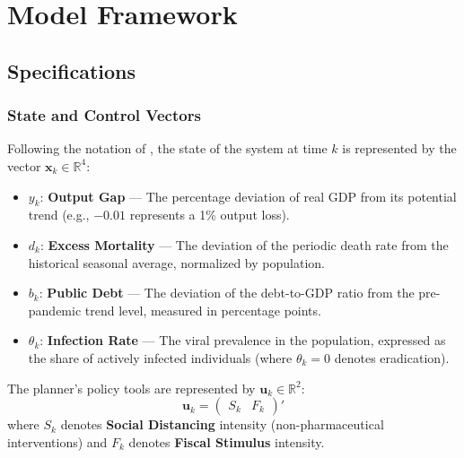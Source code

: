 


\section{Model Framework}

\subsection{Specifications}
\subsubsection{State and Control Vectors}

Following the notation of \citet{bertsekas2017dynamic}, the state of the system at time $k$  is represented by the vector $\bm{x}_k \in \mathbb{R}^4$:


\begin{itemize}
    \item $y_k$: \textbf{Output Gap} — The percentage deviation of real GDP from its potential trend (e.g., $-0.01$ represents a 1\% output loss).
    \item $d_k$: \textbf{Excess Mortality} — The deviation of the periodic death rate from the historical seasonal average, normalized by population.
    \item $b_k$: \textbf{Public Debt} — The deviation of the debt-to-GDP ratio from the pre-pandemic trend level, measured in percentage points.
    \item $\theta_k$: \textbf{Infection Rate} — The viral prevalence in the population, expressed as the share of actively infected individuals (where $\theta_k=0$ denotes eradication).
\end{itemize}

\noindent The planner's policy tools are represented by $\bm{u}_k \in \mathbb{R}^2$:
\begin{equation}
\bm{u}_k = \begin{pmatrix} S_k & F_k \end{pmatrix}'
\end{equation}
where $S_k$ denotes \textbf{Social Distancing} intensity (non-pharmaceutical interventions) and $F_k$ denotes \textbf{Fiscal Stimulus} intensity.


